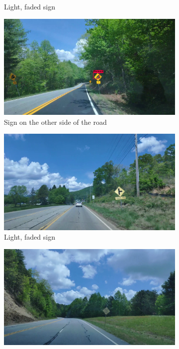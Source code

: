 \begin{figure}
\begin{center}
\begin{subfigure}[t]{.49\linewidth}
      \caption{Light, faded sign}
    \end{subfigure}
    \begin{subfigure}[t]{.49\linewidth}
      \centering
      \includegraphics[width=0.99\linewidth]{figures/examples/sr2/FN/FN_09.png}
      \caption{Sign on the other side of the road}
      \label{fig:othersideFN}
    \end{subfigure}
    \begin{subfigure}[t]{.49\linewidth}
      \centering
      \includegraphics[width=0.99\linewidth]{figures/examples/sr2/FN/FN_10.png}
      \caption{Light, faded sign}
    \end{subfigure}
    \begin{subfigure}[t]{.49\linewidth}
      \centering
      \includegraphics[width=0.99\linewidth]{figures/examples/sr2/FN/FN_06.png}

\end{subfigure}
\end{center}
\end{figure}
